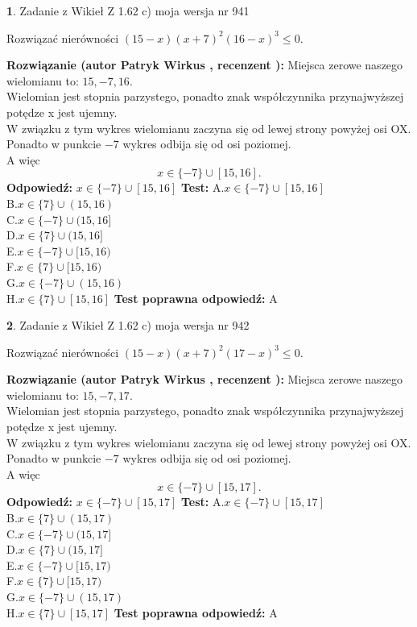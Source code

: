 \documentclass[12pt, a4paper]{article}
\theoremstyle{definition} %
\newtheorem{zad}{}
\newcommand{\zadStart}[1]{\begin{zad}#1\newline}
\newcommand{\zadStop}{\end{zad}}
\newcommand{\rozwStart}[2]{\noindent \textbf{Rozwiązanie (autor #1 , recenzent #2): }\newline}
\newcommand{\rozwStop}{\newline}
\newcommand{\odpStart}{\noindent \textbf{Odpowiedź:}\newline}
\newcommand{\odpStop}{\newline}
\newcommand{\testStart}{\noindent \textbf{Test:}\newline}
\newcommand{\testStop}{\newline}
\newcommand{\kluczStart}{\noindent \textbf{Test poprawna odpowiedź:}\newline}
\newcommand{\kluczStop}{\newline}
\begin{document}
\zadStart{Zadanie z Wikieł Z 1.62 c) moja wersja nr 941}

Rozwiązać nierówności $(15-x)(x+7)^{2}(16-x)^{3}\le0$.
\zadStop
\rozwStart{Patryk Wirkus}{}
Miejsca zerowe naszego wielomianu to: $15, -7, 16$.\\
Wielomian jest stopnia parzystego, ponadto znak współczynnika przy\linebreak najwyższej potędze x jest ujemny.\\ W związku z tym wykres wielomianu zaczyna się od lewej strony powyżej osi OX.\\
Ponadto w punkcie $-7$ wykres odbija się od osi poziomej.\\
A więc $$x \in \{-7\} \cup [15,16].$$
\rozwStop
\odpStart
$x \in \{-7\} \cup [15,16]$
\odpStop
\testStart
A.$x \in \{-7\} \cup [15,16]$\\
B.$x \in \{7\} \cup (15,16)$\\
C.$x \in \{-7\} \cup (15,16]$\\
D.$x \in \{7\} \cup (15,16]$\\
E.$x \in \{-7\} \cup [15,16)$\\
F.$x \in \{7\} \cup [15,16)$\\
G.$x \in \{-7\} \cup (15,16)$\\
H.$x \in \{7\} \cup [15,16]$
\testStop
\kluczStart
A
\kluczStop



\zadStart{Zadanie z Wikieł Z 1.62 c) moja wersja nr 942}

Rozwiązać nierówności $(15-x)(x+7)^{2}(17-x)^{3}\le0$.
\zadStop
\rozwStart{Patryk Wirkus}{}
Miejsca zerowe naszego wielomianu to: $15, -7, 17$.\\
Wielomian jest stopnia parzystego, ponadto znak współczynnika przy\linebreak najwyższej potędze x jest ujemny.\\ W związku z tym wykres wielomianu zaczyna się od lewej strony powyżej osi OX.\\
Ponadto w punkcie $-7$ wykres odbija się od osi poziomej.\\
A więc $$x \in \{-7\} \cup [15,17].$$
\rozwStop
\odpStart
$x \in \{-7\} \cup [15,17]$
\odpStop
\testStart
A.$x \in \{-7\} \cup [15,17]$\\
B.$x \in \{7\} \cup (15,17)$\\
C.$x \in \{-7\} \cup (15,17]$\\
D.$x \in \{7\} \cup (15,17]$\\
E.$x \in \{-7\} \cup [15,17)$\\
F.$x \in \{7\} \cup [15,17)$\\
G.$x \in \{-7\} \cup (15,17)$\\
H.$x \in \{7\} \cup [15,17]$
\testStop
\kluczStart
A
\kluczStop
\end{document}

